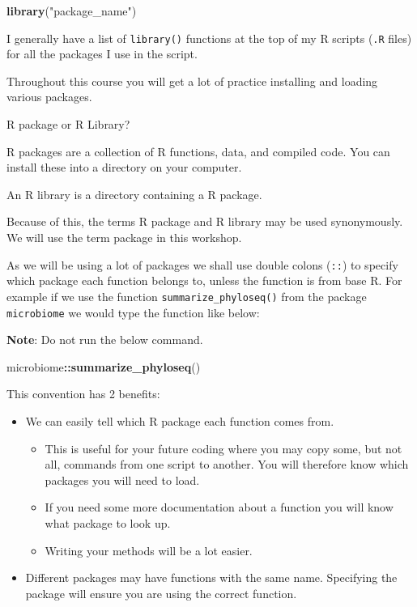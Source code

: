 \documentclass[
]{book}
\newenvironment{Shaded}{\begin{snugshade}}{\end{snugshade}}
\newcommand{\FunctionTok}[1]{\textcolor[rgb]{0.13,0.29,0.53}{\textbf{#1}}}
\newcommand{\NormalTok}[1]{#1}
\newcommand{\SpecialCharTok}[1]{\textcolor[rgb]{0.81,0.36,0.00}{\textbf{#1}}}
\newcommand{\StringTok}[1]{\textcolor[rgb]{0.31,0.60,0.02}{#1}}
\providecommand{\tightlist}{%
  \setlength{\itemsep}{0pt}\setlength{\parskip}{0pt}}
\begin{document}
\begin{Shaded}
\begin{Highlighting}[]
\FunctionTok{library}\NormalTok{(}\StringTok{"package\_name"}\NormalTok{)}
\end{Highlighting}
\end{Shaded}

I generally have a list of \texttt{library()} functions at the top of my R scripts (\texttt{.R} files) for all the packages I use in the script.

Throughout this course you will get a lot of practice installing and loading various packages.

R package or R Library?

R packages are a collection of R functions, data, and compiled code. You can install these into a directory on your computer.

An R library is a directory containing a R package.

Because of this, the terms R package and R library may be used synonymously. We will use the term package in this workshop.

As we will be using a lot of packages we shall use double colons (\texttt{::}) to specify which package each function belongs to, unless the function is from base R. For example if we use the function \texttt{summarize\_phyloseq()} from the package \texttt{microbiome} we would type the function like below:

\textbf{Note}: Do not run the below command.

\begin{Shaded}
\begin{Highlighting}[]
\NormalTok{microbiome}\SpecialCharTok{::}\FunctionTok{summarize\_phyloseq}\NormalTok{()}
\end{Highlighting}
\end{Shaded}

This convention has 2 benefits:

\begin{itemize}
\tightlist
\item
  We can easily tell which R package each function comes from.

  \begin{itemize}
  \tightlist
  \item
    This is useful for your future coding where you may copy some, but not all, commands from one script to another. You will therefore know which packages you will need to load.
  \item
    If you need some more documentation about a function you will know what package to look up.
  \item
    Writing your methods will be a lot easier.
  \end{itemize}
\item
  Different packages may have functions with the same name. Specifying the package will ensure you are using the correct function.
\end{itemize}
\end{document}
